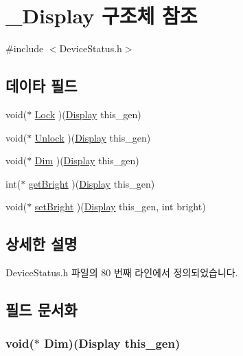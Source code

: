 \hypertarget{struct___display}{\section{\-\_\-\-Display 구조체 참조}
\label{struct___display}
}


{\ttfamily \#include $<$Device\-Status.\-h$>$}

\subsection*{데이타 필드}
\begin{DoxyCompactItemize}
\item 
void($\ast$ \hyperlink{struct___display_a8ebb33d01cded0db9f4bcdbcf44e90d0}{Lock} )(\hyperlink{namespace_3global_scope_4_struct_display}{Display} this\-\_\-gen)
\item 
void($\ast$ \hyperlink{struct___display_a2997a5ca8fcbf98731edc07b55919203}{Unlock} )(\hyperlink{namespace_3global_scope_4_struct_display}{Display} this\-\_\-gen)
\item 
void($\ast$ \hyperlink{struct___display_afe07206478960f03a500e7fc2b710446}{Dim} )(\hyperlink{namespace_3global_scope_4_struct_display}{Display} this\-\_\-gen)
\item 
int($\ast$ \hyperlink{struct___display_a61cbbbd330281072786ca6289de92a3a}{get\-Bright} )(\hyperlink{namespace_3global_scope_4_struct_display}{Display} this\-\_\-gen)
\item 
void($\ast$ \hyperlink{struct___display_acb57f785b1df759aa711224a445c004f}{set\-Bright} )(\hyperlink{namespace_3global_scope_4_struct_display}{Display} this\-\_\-gen, int bright)
\end{DoxyCompactItemize}


\subsection{상세한 설명}


Device\-Status.\-h 파일의 80 번째 라인에서 정의되었습니다.



\subsection{필드 문서화}
\hypertarget{struct___display_afe07206478960f03a500e7fc2b710446}{
\subsubsection[{Dim}]{\setlength{\rightskip}{0pt plus 5cm}void($\ast$  Dim)({\bf Display} this\-\_\-gen)}}\label{struct___display_afe07206478960f03a500e7fc2b710446}



